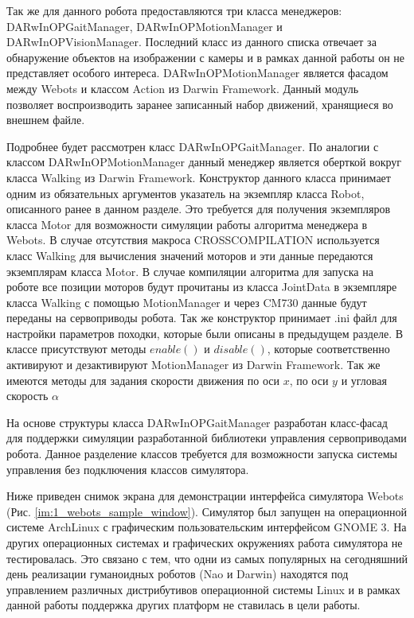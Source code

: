 Так же для данного робота предоставляются три класса менеджеров: DARwInOPGaitManager, DARwInOPMotionManager и DARwInOPVisionManager. Последний класс из данного списка отвечает за обнаружение объектов на изображении с камеры и в рамках данной работы он не представляет особого интереса. DARwInOPMotionManager является фасадом между Webots и классом Action из Darwin Framework. Данный модуль позволяет воспроизводить заранее записанный набор движений, хранящиеся во внешнем файле.

Подробнее будет рассмотрен класс DARwInOPGaitManager. По аналогии с классом DARwInOPMotionManager данный менеджер является оберткой вокруг класса Walking из Darwin Framework. Конструктор данного класса принимает одним из обязательных аргументов указатель на экземпляр класса Robot, описанного ранее в данном разделе. Это требуется для получения экземпляров класса Motor для возможности симуляции работы алгоритма менеджера в Webots. В случае отсутствия макроса CROSSCOMPILATION используется класс Walking для вычисления значений моторов и эти данные передаются экземплярам класса Motor. В случае компиляции алгоритма для запуска на роботе все позиции моторов будут прочитаны из класса JointData в экземпляре класса Walking с помощью MotionManager и через CM730 данные будут переданы на сервоприводы робота. Так же конструктор принимает \*.ini файл для настройки параметров походки, которые были описаны в предыдущем разделе. В классе присутствуют методы $enable()$ и $disable()$, которые соответственно активируют и дезактивируют MotionManager из Darwin Framework. Так же имеются методы для задания скорости движения по оси $x$, по оси $y$ и угловая скорость $\alpha$

На основе структуры класса DARwInOPGaitManager разработан класс-фасад для поддержки симуляции разработанной библиотеки управления сервоприводами робота. Данное разделение классов требуется для возможности запуска системы управления без подключения классов симулятора.

Ниже приведен снимок экрана для демонстрации интерфейса симулятора Webots (Рис. \ref{im:1_webots_sample_window}). Симулятор был запущен на операционной системе ArchLinux с графическим пользовательским интерфейсом GNOME 3. На других операционных системах и графических окружениях работа симулятора не тестировалась. Это связано с тем, что одни из самых популярных на сегодняшний день реализации гуманоидных роботов (Nao и Darwin) находятся под управлением различных дистрибутивов операционной системы Linux и в рамках данной работы поддержка других платформ не ставилась в цели работы.

